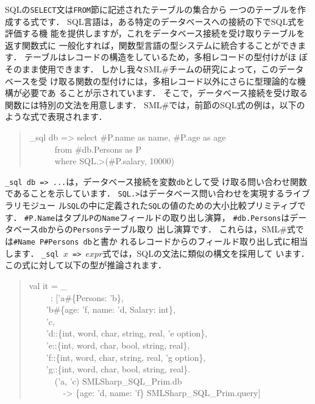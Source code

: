 \documentclass{jbook}
\newif\ifjp
\newcommand{\smlsharp}{SML\#}
\newcommand{\myem}{\mbox{\ \ }}
\newenvironment{program}{\begin{quote}\begin{tt}}%
                        {\end{tt}\end{quote}}
\begin{document}
\ifjp%
	SQLの{\tt SELECT}文は{\tt FROM}節に記述されたテーブルの集合から
一つのテーブルを作成する式です．
	SQL言語は，ある特定のデータベースへの接続の下でSQL式を評価する機
能を提供しますが，これをデータベース接続を受け取りテーブルを返す関数式に
一般化すれば，関数型言語の型システムに統合することができます．
	テーブルはレコードの構造をしているため，多相レコードの型付けがほ
ぼそのまま使用できます．
	しかし我々\smlsharp{}チームの研究によって，このデータベースを受
け取る関数の型付けには，多相レコード以外にさらに型理論的な機構が必要であ
ることが示されています\cite{ohori11}．
	そこで，データベース接続を受け取る関数には特別の文法を用意します．
	\smlsharp{}では，前節のSQL式の例は，以下のような式で表現されます．
\begin{program}
\_sql db => select \#P.name as name, \#P.age as age\\
\myem\myem\myem from \#db.Persons as P\\
\myem\myem\myem where SQL.>(\#P.salary, 10000)
\end{program}
	{\tt \_sql db => ...}は，データベース接続を変数{\tt db}として受
け取る問い合わせ関数であることを示しています．
	{\tt SQL.>}はデータベース問い合わせを実現するライブラリモジュー
ル{\tt SQL}の中に定義された{\tt SQL}の値のための大小比較プリミティブです．
	{\tt \#P.Name}はタプル{\tt P}の{\tt Name}フィールドの取り出し演算，
{\tt \#db.Persons}はデータベース{\tt db}からの{\tt Persons}テーブル取り
出し演算です．
	これらは，\smlsharp{}式では{\tt \#Name P}{\tt \#Persons db}と書か
れるレコードからのフィールド取り出し式に相当します．
	{\tt \_sql $x$ => $expr$}式では，SQLの文法に類似の構文を採用して
います．
	この式に対して以下の型が推論されます．
\begin{program}
val it = \_
\\\myem\ \ \   : ['a\#\{Persons: 'b\},
\\\myem\myem     'b\#\{age: 'f, name: 'd, Salary: int\},
\\\myem\myem     'c,
\\\myem\myem     'd::\{int, word, char, string, real, 'e option\},
\\\myem\myem     'e::\{int, word, char, bool, string, real\},
\\\myem\myem     'f::\{int, word, char, string, real, 'g option\},
\\\myem\myem     'g::\{int, word, char, bool, string, real\}.
\\\myem\myem\myem       ('a, 'c) SMLSharp\_SQL\_Prim.db
\\\myem\myem\myem\myem  -> \{age: 'd, name: 'f\} SMLSharp\_SQL\_Prim.query]
\end{program}
\end{document}
